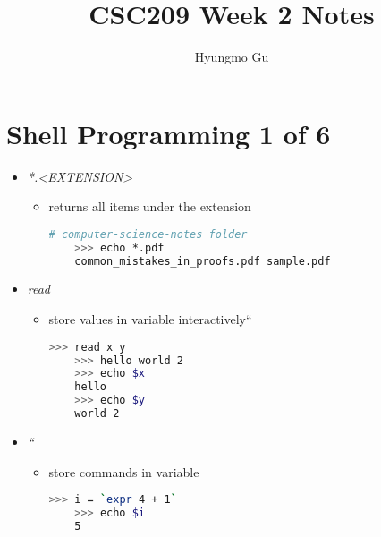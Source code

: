 \documentclass[12pt]{article}
\begin{document}
\title{CSC209 Week 2 Notes}
\author{Hyungmo Gu}
\maketitle

\section*{Shell Programming 1 of 6}
\begin{itemize}
    \item \textit{*.\textless EXTENSION\textgreater}
    \begin{itemize}
    \item returns all items under the extension

    \begin{lstlisting}[language=bash]
    # computer-science-notes folder
    >>> echo *.pdf
    common_mistakes_in_proofs.pdf sample.pdf
    \end{lstlisting}

    \end{itemize}
    \item \textit{read}
    \begin{itemize}
    \item store values in variable interactively``

    \begin{lstlisting}[language=bash]
    >>> read x y
    >>> hello world 2
    >>> echo $x
    hello
    >>> echo $y
    world 2
    \end{lstlisting}

    \end{itemize}
    \item \textit{``}
    \begin{itemize}
    \item store commands in variable

    \begin{lstlisting}[language=bash]
    >>> i = `expr 4 + 1`
    >>> echo $i
    5
    \end{lstlisting}
    \end{itemize}
\end{itemize}
\end{document}
